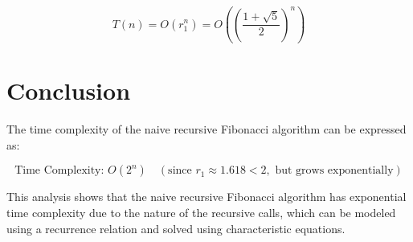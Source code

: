 \documentclass{article}
\begin{document}
	$$T(n) = O(r_1^n) = O\left(\left(\frac{1 + \sqrt{5}}{2}\right)^n\right)$$
	
	\section*{Conclusion}
	
	The time complexity of the naive recursive Fibonacci algorithm can be expressed as:
	
	$$\text{Time Complexity: } O(2^n) \quad (\text{since } r_1 \approx 1.618 < 2, \text{ but grows exponentially})$$
	
	This analysis shows that the naive recursive Fibonacci algorithm has exponential time complexity due to the nature of the recursive calls, which can be modeled using a recurrence relation and solved using characteristic equations.
	
\end{document}
